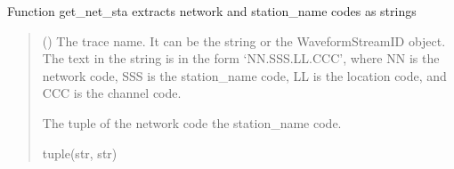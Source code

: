 \documentclass[letterpaper,10pt,english]{sphinxmanual}
\begin{document}

\begin{fulllineitems}
\label{\detokenize{api_core:core.utils.get_net_sta}}
\pysigstartsignatures
{}
\pysigstopsignatures
\sphinxAtStartPar
Function get\_net\_sta extracts network and station\_name codes as strings
\begin{quote}\begin{description}
\sphinxAtStartPar
{} () \textendash{} The trace name. It can be the string or the WaveformStreamID object.
The text in the string is in the form ‘NN.SSS.LL.CCC’, where NN is the network code,
SSS is the station\_name code, LL is the location code, and CCC is the channel code.

\sphinxAtStartPar
The tuple of the network code the station\_name code.

\sphinxAtStartPar
tuple(str, str)

\end{description}\end{quote}

\end{fulllineitems}

\end{document}
